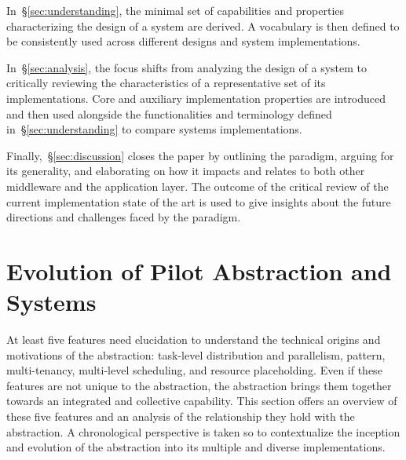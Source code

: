 \documentclass{sig-alternate}
\begin{document}
In~\S\ref{sec:understanding}, the minimal set of capabilities and properties
characterizing the design of a \pilotjob system are derived. A vocabulary is
then defined to be consistently used across different designs and
\pilotjob system implementations.

In~\S\ref{sec:analysis}, the focus shifts from analyzing the design of a
\pilotjob system to critically reviewing the characteristics of a representative
set of its implementations. Core and auxiliary implementation properties are
introduced and then used alongside the functionalities and terminology defined
in~\S\ref{sec:understanding} to compare \pilotjob systems implementations.

Finally,~\S\ref{sec:discussion} closes the paper by outlining the \pilot
paradigm, arguing for its generality, and elaborating on how it impacts and
relates to both other middleware and the application layer. The outcome of the
critical review of the current implementation state of the art is used to give
insights about the future directions and challenges faced by the \pilot
paradigm.


%
\section{Evolution of Pilot Abstraction and Systems}
\label{sec:history}


At least five features need elucidation to understand the technical origins and
motivations of the \pilot abstraction: task-level distribution and parallelism,
\MW pattern, multi-tenancy, multi-level scheduling, and resource placeholding.
Even if these features are not unique to the \pilot abstraction, the \pilot
abstraction brings them together towards an integrated and collective
capability. This section offers an overview of these five features and an
analysis of the relationship they hold with the \pilot abstraction. A
chronological perspective is taken so to contextualize the inception and
evolution of the \pilot abstraction into its multiple and diverse
implementations.
\end{document}
